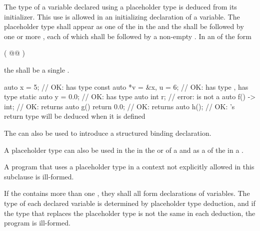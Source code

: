 \pnum
The type of a variable declared using a placeholder type is
deduced from its initializer.
This use is allowed
in an initializing declaration of a variable.
The placeholder type shall appear as one of the
 in the
 and the
shall be followed by one or more
,
each of which shall
be followed by a non-empty
.
In an  of the form
\begin{codeblock}
( @\textrm{}@ )
\end{codeblock}
the  shall be a single
.
\begin{example}
\begin{codeblock}
auto x = 5;                     // OK:  has type 
const auto *v = &x, u = 6;      // OK:  has type ,  has type 
static auto y = 0.0;            // OK:  has type 
auto int r;                     // error:  is not a 
auto f() -> int;                // OK:  returns 
auto g() { return 0.0; }        // OK:  returns 
auto h();                       // OK: 's return type will be deduced when it is defined
\end{codeblock}
\end{example}
The  
can also be used to introduce
a structured binding declaration.

\pnum
A placeholder type can also be used
in the  in
the  or  of a
and as a 
of the 
in a .

\pnum
A program that uses a placeholder type in a context not
explicitly allowed in this subclause is ill-formed.

\pnum
If the  contains more than one
, they shall all form declarations of
variables. The type of each declared variable is determined
by placeholder type deduction,
and if the type that replaces the placeholder type is not the
same in each deduction, the program is ill-formed.


